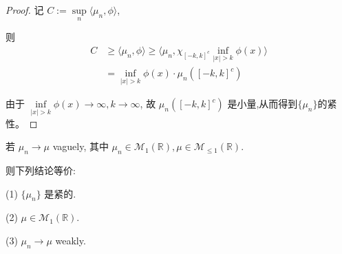 \begin{proof}
   记 $C := \sup\limits_{n} \langle \mu_n, \phi \rangle$,  

则 
\begin{equation*}
    \begin{aligned}
        C &\geq \langle \mu_n, \phi \rangle \geq \langle \mu_n, \chi_{[-k,k]^c} \inf_{|x| > k} \phi(x) \rangle\\
        &= \inf_{|x| > k} \phi(x)\cdot \mu_n([-k,k]^c)
    \end{aligned}
\end{equation*}

由于 $\inf\limits_{|x| > k} \phi(x) \rightarrow \infty, k \rightarrow \infty$, 故 $\mu_n([-k,k]^c)$ 是小量,从而得到$\{\mu_n\}$的紧性。
\end{proof}

\begin{lemma}
若 $\mu_n \rightarrow \mu$ vaguely, 其中 $\mu_n \in \mathcal{M}_1(\mathbb{R}), \mu\in\mathcal{M}_{\leq 1}(\mathbb{R})$.

则下列结论等价:

(1) $\{\mu_n\}$ 是紧的.


(2) $\mu\in\mathcal{M}_1(\mathbb{R})$.

(3) $\mu_n \rightarrow \mu$ weakly.
\end{lemma}


